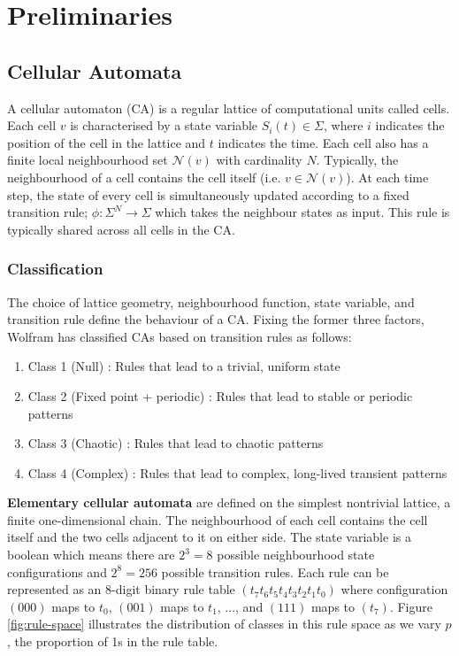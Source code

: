 \chapter{Preliminaries}

\section{Cellular Automata}

A cellular automaton (CA) is a regular lattice of computational units called cells. Each cell $v$ is characterised by a state variable $S_i(t) \in \Sigma$, where $i$ indicates the position of the cell in the lattice and $t$ indicates the time. Each cell also has a finite local neighbourhood set $\mathcal{N}(v)$ with cardinality $N$. Typically, the neighbourhood of a cell contains the cell itself (i.e. $v \in \mathcal{N}(v)$). At each time step, the state of every cell is simultaneously updated according to a fixed transition rule; $\phi:\Sigma^N \to \Sigma$ which takes the neighbour states as input. This rule is typically shared across all cells in the CA.

\subsection{Classification}

The choice of lattice geometry, neighbourhood function, state variable, and transition rule define the behaviour of a CA. Fixing the former three factors, Wolfram \cite{wolfram1986theory} has classified CAs based on transition rules as follows:
\begin{enumerate}
  \item Class 1 (Null) : Rules that lead to a trivial, uniform state
  \item Class 2 (Fixed point + periodic) : Rules that lead to stable or periodic patterns
  \item Class 3 (Chaotic) : Rules that lead to chaotic patterns
  \item Class 4 (Complex) : Rules that lead to complex, long-lived transient patterns
\end{enumerate}

\textbf{Elementary cellular automata} are defined on the simplest nontrivial lattice, a finite one-dimensional chain. The neighbourhood of each cell contains the cell itself and the two cells adjacent to it on either side. The state variable is a boolean which means there are $2^3 = 8$ possible neighbourhood state configurations and $2^8 = 256$ possible transition rules. Each rule can be represented as an 8-digit binary rule table $(t_7t_6t_5t_4t_3t_2t_1t_0)$ where configuration $(000)$ maps to $t_0$, $(001)$ maps to $t_1$, ..., and $(111)$ maps to $(t_7)$. Figure \ref{fig:rule-space} illustrates the distribution of classes in this rule space as we vary $p$, the proportion of 1s in the rule table. \\


